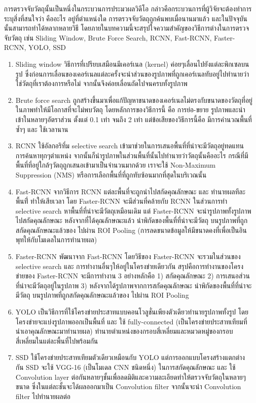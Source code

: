การตรวจจับวัตถุนั้นเป็นหนึ่งในกระบวนการประมวผลวิดีโอ กล่าวคือกระบวนการที่ผู้วิจัยจะต้องทำการระบุสิ่งที่สนใจว่า คืออะไร อยู่ที่ตำแหน่งใด การตรวจจับวัตถุถูกค้นพบเมื่อนานมาแล้ว 
และในปัจจุบันนั้นสามารถทำได้หลากหลายวิธี โดยภายในบทความนี้จะสรุปใจความสำคัญของวิธีการต่างในการตรวจจับวัตถุ เช่น Sliding Window, Brute Force Search, RCNN, Fast-RCNN, Faster-RCNN, YOLO, SSD 
\begin{enumerate}
	\item Sliding window วิธีการที่เปรียบเสมือนมีเคอร์เนล (kernel) ค่อยๆเลื่อนไปยังแต่ละพิกเซลบนรูป ซึ่งก่อนการเลื่อนของเคอร์เนลแต่ละครั้งจะนำส่วนของรูปภาพที่ถูกเคอร์เนลทับอยู่ไปทำนายว่าใช่วัตถุที่เราต้องการหรือไม่ 
	จากนั้นจึงค่อยเลื่อนถัดไปจนครบทั้งรูปภาพ
	\item Brute force search ถูกสร้างขึ้นมาเพื่อแก้ปัญหาขนาดของเคอร์เนลไม่ตรงกับขนาดของวัตถุที่อยู่ในภาพทำให้มีโอกาสที่จะไม่พบวัตถุ โดยหลักการของวิธีการนี้ คือ การย่อ-ขยาย รูปภาพและนำเข้าในหลายๆอัตราส่วน ตั้งแต่ 0.1 เท่า จนถึง 2 เท่า แต่ข้อเสียของวิธีการนี้คือ มีการคำนวณพื้นที่ซ้ำๆ และ ใช้เวลานาน
	\item RCNN ใช้อัลกอริทึ่ม selective search เข้ามาช่วยในการเสนอพื้นที่ที่น่าจะมีวัตถุอยู่ทดแทนการค้นหาทุกๆตำแหน่ง จากนั้นก็นำรูปภาพในส่วนพื้นที่นั้นไปทำนายว่าวัตถุนั้นคืออะไร กรณีที่มีพื้นที่ที่อยู่ใกล้ๆวัตถุถูกเสนอเข้ามาเป็นจำนวนมากด้วย เราจะใช้ Non-Maximum Suppression (NMS) หรือการเลือกพื้นที่ที่ถูกทับซ้อนมากที่สุดในบริเวณนั้น
	\item Fast-RCNN จากวิธีการ RCNN แต่ละพื้นที่จะถูกนำไปสกัดคุณลักษณะ และ ทำนายผลทีละพื้นที่่ ทำให้เสียเวลา โดย Faster-RCNN จะมีส่วนที่คล้ายกับ RCNN ในส่วนการทำ selective search หาพื้นที่ที่น่าจะมีวัตถุเหมือนเดิม แต่ Faster-RCNN จะนำรูปภาพทั้งรูปภาพไปสกัดคุณลักษณะ หลังจากที่ได้คุณลักษณะแล้ว นำพิกัดของพื้นที่ที่น่าจะมีวัตถุ บนรูปภาพที่ถูกสกัดคุณลักษณะแล้วของ ไปผ่าน ROI Pooling (การลดขนาดข้อมูลให้มีขนาดคงที่เพื่อเป็นอินพุทให้กับโมเดลในการทำนายผล)
	\item Faster-RCNN พัฒนาจาก Fast-RCNN โดยวิธีของ Faster-RCNN จะรวมในส่วนของ selective search และ การทำงานอื่นๆให้อยู่ในโครงข่ายเดียวกัน สรุปคือการทำงานของโครงข่ายของ Faster-RCNN จะมีการทำงาน 3 อย่างหลักคือ 1) สกัดคุณลักษณะ 2) การเสนอส่วนที่น่าจะมีวัตถุอยู่ในรูปภาพ 3) หลังจากได้รูปภาพจากการสกัดคุณลักษณะ นำพิกัดของพื้นที่ที่น่าจะมีวัตถุ บนรูปภาพที่ถูกสกัดคุณลักษณะแล้วของ ไปผ่าน ROI Pooling
	\item YOLO เป็นวิธีการที่ใช้โครงข่ายประสาทแบบคอนโวลูชั่นเพียงตัวเดียวทำนายรูปภาพทั้งรูป โดยโครงข่ายจะแบ่งรูปภาพออกเป็นพื้นที่ และ ใช้ fully-connected (เป็นโครงข่ายประสาทเทียมที่นำเอาคุณลักษณะมาทำนายผล) ทำนายตำแหน่งของกรอบสี่เหลี่ยมและหมวดหมู่ของกรอบสี่เหลี่ยมในแต่ละพื้นที่ไปพร้อมกัน 
	\item SSD ใช้โครงข่ายประสาทเทียมตัวเดียวเหมือนกับ YOLO แต่การออกแบบโครงสร้างแตกต่างกัน SSD จะใช้ VGG-16 (เป็นโมเดล CNN ชนิดหนึ่ง) ในการสกัดคุณลักษณะ และ ใช้ Convolution layer ต่อกันหลายๆชั้นเพื่อลดมิติและความละเอียดทำให้ตรวจจับวัตถุในหลายๆขนาด ซึ่งในแต่ละชั้นจะได้ผลออกมาเป็น Convolution filter จากนั้นจะนำ Convolution filter ไปทำนายผลต่อ
\end{enumerate}
